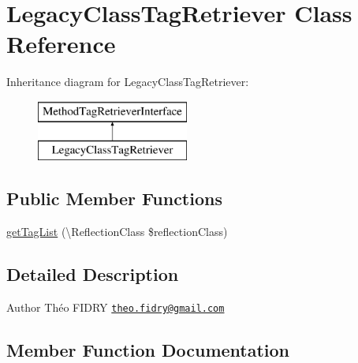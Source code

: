 \hypertarget{class_prophecy_1_1_php_documentor_1_1_legacy_class_tag_retriever}{}\section{Legacy\+Class\+Tag\+Retriever Class Reference}
\label{class_prophecy_1_1_php_documentor_1_1_legacy_class_tag_retriever}
Inheritance diagram for Legacy\+Class\+Tag\+Retriever\+:\begin{figure}[H]
\begin{center}
\leavevmode
\includegraphics[height=2.000000cm]{class_prophecy_1_1_php_documentor_1_1_legacy_class_tag_retriever}
\end{center}
\end{figure}
\subsection*{Public Member Functions}
\begin{DoxyCompactItemize}
\item 
\mbox{\hyperlink{class_prophecy_1_1_php_documentor_1_1_legacy_class_tag_retriever_a2eb68ce00dcc84a156b9a2b7844a5e6f}{get\+Tag\+List}} (\textbackslash{}Reflection\+Class \$reflection\+Class)
\end{DoxyCompactItemize}


\subsection{Detailed Description}
\begin{DoxyAuthor}{Author}
Théo F\+I\+D\+RY \href{mailto:theo.fidry@gmail.com}{\tt theo.\+fidry@gmail.\+com} 
\end{DoxyAuthor}


\subsection{Member Function Documentation}
\mbox{\label{class_prophecy_1_1_php_documentor_1_1_legacy_class_tag_retriever_a2eb68ce00dcc84a156b9a2b7844a5e6f}} 

